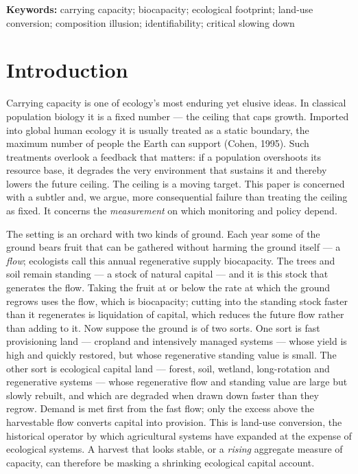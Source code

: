 \documentclass[11pt]{article}
\begin{document}
\medskip
\noindent\textbf{Keywords:} carrying capacity; biocapacity; ecological footprint; land-use conversion; composition illusion; identifiability; critical slowing down

\section{Introduction}

Carrying capacity is one of ecology's most enduring yet elusive ideas. In classical population biology it is a fixed number --- the ceiling that caps growth. Imported into global human ecology it is usually treated as a static boundary, the maximum number of people the Earth can support (Cohen, 1995). Such treatments overlook a feedback that matters: if a population overshoots its resource base, it degrades the very environment that sustains it and thereby lowers the future ceiling. The ceiling is a moving target. This paper is concerned with a subtler and, we argue, more consequential failure than treating the ceiling as fixed. It concerns the \emph{measurement} on which monitoring and policy depend.

The setting is an orchard with two kinds of ground. Each year some of the ground bears fruit that can be gathered without harming the ground itself --- a \emph{flow}; ecologists call this annual regenerative supply biocapacity. The trees and soil remain standing --- a stock of natural capital --- and it is this stock that generates the flow. Taking the fruit at or below the rate at which the ground regrows uses the flow, which is biocapacity; cutting into the standing stock faster than it regenerates is liquidation of capital, which reduces the future flow rather than adding to it. Now suppose the ground is of two sorts. One sort is fast provisioning land --- cropland and intensively managed systems --- whose yield is high and quickly restored, but whose regenerative standing value is small. The other sort is ecological capital land --- forest, soil, wetland, long-rotation and regenerative systems --- whose regenerative flow and standing value are large but slowly rebuilt, and which are degraded when drawn down faster than they regrow. Demand is met first from the fast flow; only the excess above the harvestable flow converts capital into provision. This is land-use conversion, the historical operator by which agricultural systems have expanded at the expense of ecological systems. A harvest that looks stable, or a \emph{rising} aggregate measure of capacity, can therefore be masking a shrinking ecological capital account.
\end{document}
